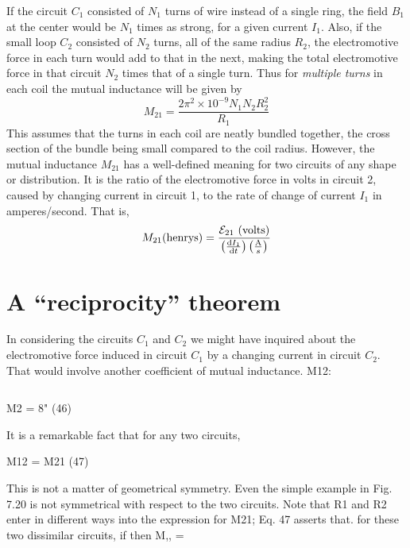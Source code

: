 If the circuit $C_1$ consisted of $N_1$ turns of wire instead of a single
ring, the field $B_1$ at the center would be $N_1$ times as strong, for a given
current $I_1$. Also, if the small loop $C_2$ consisted of $N_2$ turns, all of the
same radius $R_2$, the electromotive force in each turn would add to
that in the next, making the total electromotive force in that circuit
$N_2$ times that of a single turn. Thus for \emph{multiple turns} in each coil
the mutual inductance will be given by
\begin{equation}
  M_{21} = \frac{2\pi^2 \times 10^{-9}N_1N_2R_2^2}{R_1}
\end{equation}
This assumes that the turns in each coil are neatly bundled 
together, the cross section of the bundle being small compared to the
coil radius. However, the mutual inductance $M_{21}$ has a well-defined
meaning for two circuits of any shape or distribution. It is the ratio
of the electromotive force in volts in circuit 2, caused by changing
current in circuit 1, to the rate of change of current $I_1$ in amperes/second.
That is,
\begin{equation}
  M_{21}(\text{henrys})
        = \frac{\mathcal{E}_{21}\ (\text{volts})}{\left(\frac{\textup{d} I_1}{\textup{d} t}\right)\left(\frac{\text{A}}{s}\right)}
\end{equation}


\iffalse

\section{A ``reciprocity'' theorem}

In considering the circuits $C_1$ and $C_2$ we might have inquired about
the electromotive force induced in circuit $C_1$ by a changing current
in circuit $C_2$. That would involve another coefficient of mutual
inductance. M12:

\begin{equation}
\end{equation}

M2 = 8" (46)

It is a remarkable fact that for any two circuits,

\begin{equation}
\end{equation}
M12 = M21 (47)

This is not a matter of geometrical symmetry. Even the simple
example in Fig. 7.20 is not symmetrical with respect to the two
circuits. Note that R1 and R2 enter in different ways into the expression
for M21; Eq. 47 asserts that. for these two dissimilar circuits, if
 then M,, = 

